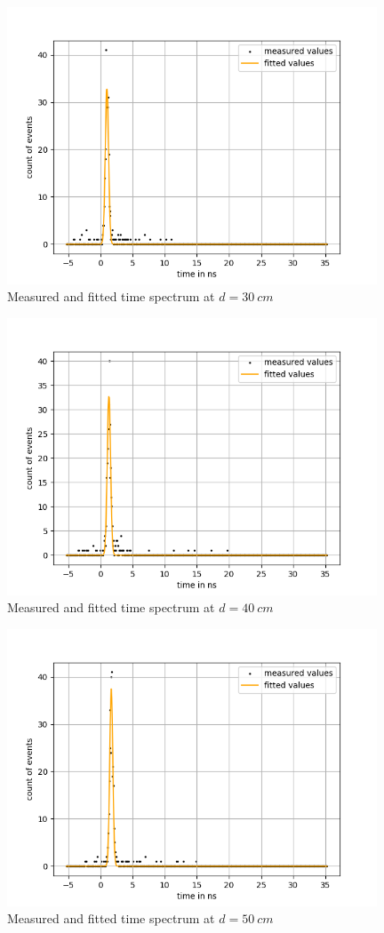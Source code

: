 \begin{figure}[H]
    \centering
    \includegraphics[width=110mm,scale=0.5]{Positronium/include/lightspeed fits3.png}
    \caption{Measured and fitted time spectrum  at $d = \SI{30}{cm}$} 
   
\end{figure}
\begin{figure}[H]
    \centering
    \includegraphics[width=110mm,scale=0.5]{Positronium/include/lightspeed fits4.png}
    \caption{Measured and fitted time spectrum  at $d = \SI{40}{cm}$} 
    
\end{figure}
\begin{figure}[H]
    \centering
    \includegraphics[width=110mm,scale=0.5]{Positronium/include/lightspeed fits5.png}
    \caption{Measured and fitted time spectrum at $d = \SI{50}{cm}$} 
   
\end{figure}

